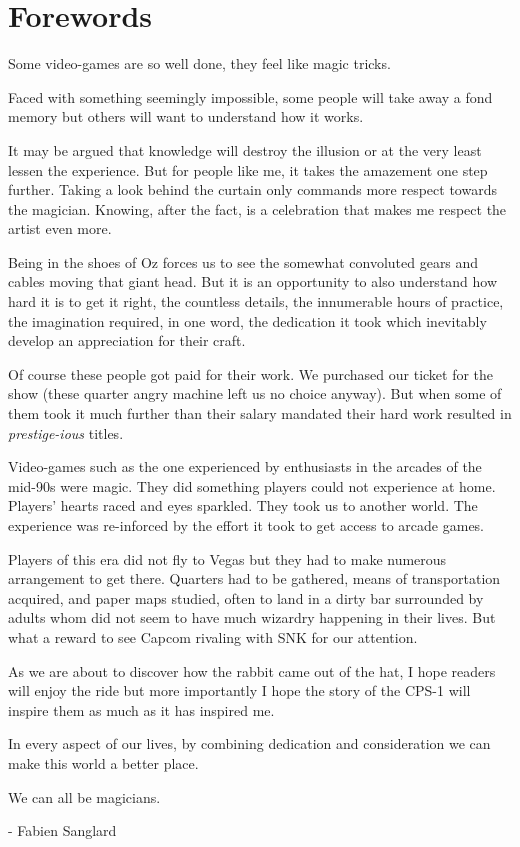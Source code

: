 \chapter*{Forewords}

Some video-games are so well done, they feel like magic tricks.

Faced with something seemingly impossible, some people will take away a fond memory but others will want to understand
how it works.

It may be argued that knowledge will destroy the illusion or at the very least lessen the experience. But for people like me, it takes the amazement one step further. Taking a look behind the curtain only commands more respect towards the magician. Knowing, after the fact, is a celebration that makes me respect the artist even more.

Being in the shoes of Oz forces us to see the somewhat convoluted gears and cables moving that giant head. But it is an opportunity to also understand how hard it is to get it right, the countless details, the innumerable hours of practice, the imagination required, in one word, the dedication it took which inevitably develop an appreciation for their craft.


Of course these people got paid for their work. We purchased our ticket for the show (these quarter angry machine left us no choice anyway). But when some of them took it much further than their salary mandated their hard work resulted in \emph{prestige-ious} titles.

Video-games such as the one experienced by enthusiasts in the arcades of the mid-90s were magic. They did something players could not experience at home. Players' hearts raced and eyes sparkled. They took us to another world. The experience was re-inforced by the effort it took to get access to arcade games. 

Players of this era did not fly to Vegas but they had to make numerous arrangement to get there. Quarters had to be gathered,  means of transportation acquired, and paper maps studied, often to land in a dirty bar surrounded by adults whom did not seem to have much wizardry happening in their lives. But what a reward to see Capcom rivaling with SNK for our attention. 

As we are about to discover how the rabbit came out of the hat, I hope readers will enjoy the ride but more importantly I hope the story of the CPS-1 will inspire them as much as it has inspired me.

In every aspect of our lives, by combining dedication and consideration we can make this world a better place. 

We can all be magicians.

- Fabien Sanglard